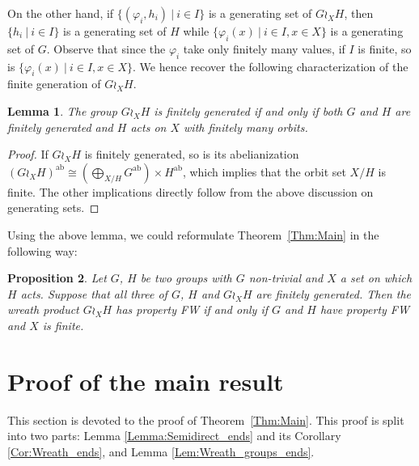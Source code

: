 \documentclass[a4paper]{article}
\newtheorem{lem}{Lemma}[section]
\newtheorem{prop}[lem]{Proposition}
\theoremstyle{definition}
\theoremstyle{remark}
\DeclareMathOperator\ab{ab}
\newcommand{\setst}[2]{\{#1\ |\ #2\}}
\begin{document}
On the other hand, if $\setst{(\varphi_i,h_i)}{i\in I}$ is a generating set of $G\wr_XH$, then $\setst{h_i}{i\in I}$ is a generating set of $H$ while $\setst{\varphi_i(x)}{i\in I,x\in X}$ is a generating set of $G$.
Observe that since the $\varphi_i$ take only finitely many values, if $I$ is finite, so is $\setst{\varphi_i(x)}{i\in I,x\in X}$.
We hence recover the following characterization of the finite generation of $G\wr_XH$.


\begin{lem}
The group $G\wr_XH$ is finitely generated if and only if both $G$ and $H$ are finitely generated and $H$ acts on $X$ with finitely many orbits.
\end{lem}
\begin{proof}
If $G\wr_XH$ is finitely generated, so is its abelianization $(G\wr_XH)^{\ab}\cong (\bigoplus_{X/H}G^{\ab})\times H^{\ab}$, which implies that the orbit set $X/H$ is finite. The other implications directly follow from the above discussion on generating sets.
\end{proof}
%
%
Using the above lemma, we could reformulate Theorem~\ref{Thm:Main} in the following way:
%
%
\begin{prop}
Let $G$, $H$ be two groups with $G$ non-trivial and $X$ a set on which $H$ acts. Suppose that all three of $G$, $H$ and $G\wr_XH$ are finitely generated. Then the wreath product $G\wr_XH$ has property FW if and only if $G$ and $H$ have property FW and $X$ is finite.
\end{prop}











\section{Proof of the main result}
\label{Section:Proof}
%

This section is devoted to the proof of Theorem~\ref{Thm:Main}. This proof is split into two parts: Lemma \ref{Lemma:Semidirect_ends} and its Corollary \ref{Cor:Wreath_ends}, and Lemma \ref{Lem:Wreath_groups_ends}.
\end{document}
